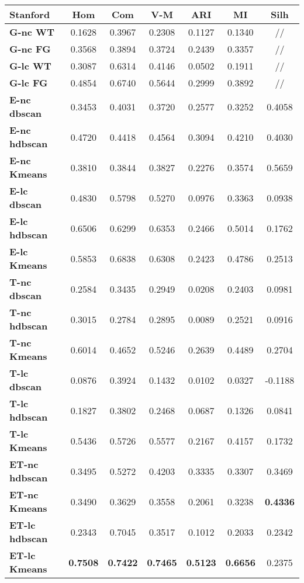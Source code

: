 \begin{table}[H]
	\begin{tabular}{| l | c | c | c | c | c | c |}
	\hline
	\textbf{Stanford}  & \textbf{Hom} & \textbf{Com} & \textbf{V-M}  & \textbf{ARI}  & \textbf{MI} & \textbf{Silh} \\ [2ex] 
	\hline
	\textbf{G-nc WT} & 0.1628 & 0.3967 & 0.2308 & 0.1127 & 0.1340 & // \\[2ex]
	 \hline
	\textbf{G-nc FG} & 0.3568 & 0.3894 & 0.3724 & 0.2439 & 0.3357 & // \\[2ex]
	 \hline	
	\textbf{G-lc WT} & 0.3087 & 0.6314 & 0.4146 & 0.0502 & 0.1911 & // \\[2ex]
	 \hline	
	\textbf{G-lc FG} & 0.4854 & 0.6740 & 0.5644 & 0.2999 & 0.3892 & // \\ [2ex]
	\hline

	\textbf{E-nc dbscan} & 0.3453 & 0.4031 & 0.3720 & 0.2577 & 0.3252 & 0.4058\\ [2ex]
	 \hline 
	\textbf{E-nc hdbscan} & 0.4720 & 0.4418 & 0.4564 & 0.3094 & 0.4210 & 0.4030\\ [2ex]
	 \hline
	\textbf{E-nc Kmeans} & 0.3810 & 0.3844 & 0.3827 & 0.2276 & 0.3574 & 0.5659\\ [2ex]
	 \hline	
	\textbf{E-lc dbscan} & 0.4830 & 0.5798 & 0.5270 & 0.0976 & 0.3363 & 0.0938\\ [2ex]
	\hline
	\textbf{E-lc hdbscan} & 0.6506 & 0.6299 & 0.6353 & 0.2466 & 0.5014 & 0.1762\\ [2ex]
	\hline
	\textbf{E-lc Kmeans} & 0.5853 & 0.6838 & 0.6308 & 0.2423 & 0.4786 & 0.2513\\ [2ex]
	\hline
	
	\textbf{T-nc dbscan} & 0.2584 & 0.3435 & 0.2949 & 0.0208 & 0.2403 & 0.0981\\ [2ex]
	 \hline 
	\textbf{T-nc hdbscan} & 0.3015 & 0.2784 & 0.2895 & 0.0089 & 0.2521 & 0.0916\\ [2ex]
	 \hline
	\textbf{T-nc Kmeans} & 0.6014 & 0.4652 & 0.5246 & 0.2639 & 0.4489 & 0.2704\\ [2ex]
	 \hline	
	\textbf{T-lc dbscan} & 0.0876 & 0.3924 & 0.1432 & 0.0102 & 0.0327 & -0.1188\\ [2ex]
	\hline
	\textbf{T-lc hdbscan} & 0.1827 & 0.3802 & 0.2468 & 0.0687 & 0.1326 & 0.0841\\ [2ex]
	\hline
	\textbf{T-lc Kmeans} & 0.5436 & 0.5726 & 0.5577 & 0.2167 & 0.4157 & 0.1732\\ [2ex]
	\hline

	\textbf{ET-nc hdbscan} & 0.3495 & 0.5272 & 0.4203 & 0.3335 & 0.3307 & 0.3469\\ [2ex]
	 \hline
	\textbf{ET-nc Kmeans} & 0.3490 & 0.3629 & 0.3558 & 0.2061 & 0.3238 & \textbf{0.4336}\\ [2ex]
	 \hline	
	\textbf{ET-lc hdbscan} & 0.2343 & 0.7045 & 0.3517 & 0.1012 & 0.2033 & 0.2342\\ [2ex]
	\hline
	\textbf{ET-lc Kmeans} & \textbf{0.7508} & \textbf{0.7422} & \textbf{0.7465} & \textbf{0.5123} & \textbf{0.6656} & 0.2375\\ [2ex]
	\hline	
	

\end{tabular}
\end{table}
